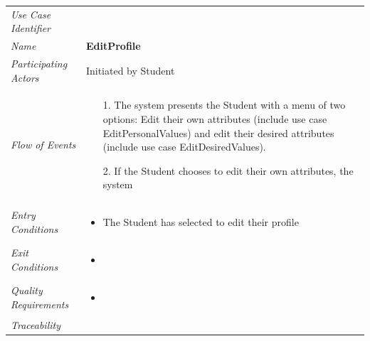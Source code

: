 \documentclass[12pt,letterpaper]{article}
\begin{document}
\begin{center}
	\begin{tabu} to 
		\toprule
		Use Case Identifier & \editprofile{} \\
		Name & {\bf EditProfile} \\
		Participating Actors & Initiated by Student \\
		Flow of Events & 
	    \begin{enumerate}[topsep=-1em, leftmargin=*]
		    \item[1.] The system presents the Student with a menu of two options: Edit their own attributes (include use case EditPersonalValues) and edit their desired attributes (include use case EditDesiredValues).
		    \item[2.] If the Student chooses to edit their own attributes, the system 
		\end{enumerate} \\

		Entry Conditions &
		\begin{itemize}[topsep=-1em, leftmargin=*]
		    \item The Student has selected to edit their profile
        \end{itemize} \\

		Exit Conditions &
		\begin{itemize}[topsep=-1em, leftmargin=*]
		    \item 
        \end{itemize} \\

		Quality Requirements &
		\begin{itemize}[topsep=-1em, leftmargin=*]
		    \item 
        \end{itemize} \\

		Traceability &  \\
		\toprule
	\end{tabu}
\end{center}
\end{document}
